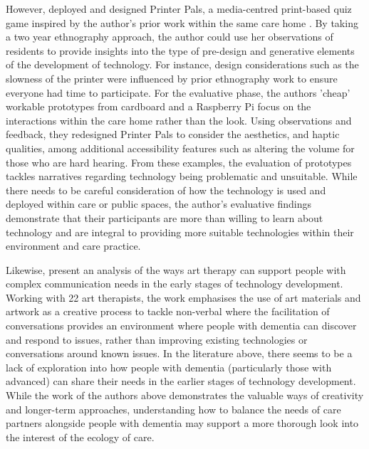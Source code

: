 However, \cite{foley_printer_2019} deployed and designed Printer Pals, a media-centred print-based quiz game inspired by the author's prior work within the same care home \citep{foley_struggle_2019}. By taking a two year ethnography approach, the author could use her observations of residents to provide insights into the type of pre-design and generative elements of the development of technology. For instance, design considerations such as the slowness of the printer were influenced by prior ethnography work to ensure everyone had time to participate. For the evaluative phase, the authors 'cheap' workable prototypes from cardboard and a Raspberry Pi focus on the interactions within the care home rather than the look. Using observations and feedback, they redesigned Printer Pals to consider the aesthetics, and haptic qualities, among additional accessibility features such as altering the volume for those who are hard hearing. From these examples, the evaluation of prototypes tackles narratives regarding technology being problematic and unsuitable. While there needs to be careful consideration of how the technology is used and deployed within care or public spaces, the author's evaluative findings demonstrate that their participants are more than willing to learn about technology and are integral to providing more suitable technologies within their environment and care practice.

Likewise, \cite{lazar2018making} present an analysis of the ways art therapy can support people with complex communication needs in the early stages of technology development. Working with 22 art therapists, the work emphasises the use of art materials and artwork as a creative process to tackle non-verbal where the facilitation of conversations provides an environment where people with dementia can discover and respond to issues, rather than improving existing technologies or conversations around known issues. In the literature above, there seems to be a lack of exploration into how people with dementia (particularly those with advanced) can share their needs in the earlier stages of technology development. While the work of the authors above demonstrates the valuable ways of creativity and longer-term approaches, understanding how to balance the needs of care partners alongside people with dementia may support a more thorough look into the interest of the ecology of care.

